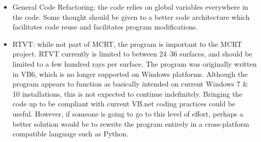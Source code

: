 \documentclass{article}
\begin{document}
\begin{itemize}
    \item General Code Refactoring: the code relies on global variables everywhere in the code. Some thought should be given to a better code architecture which facilitates code reuse and facilitates program modifications.

    \item RTVT: while not part of MCRT, the program is important to the MCRT project. RTVT currently is limited to between 24--36 surfaces, and should be limited to a few hundred rays per surface. The program was originally written in VB6, which is no longer supported on Windows platforms. Although the program appears to function as basically intended on current Windows 7 \& 10 installations, this is not expected to continue indefinitely. Bringing the code up to be compliant with current VB.net coding practices could be useful. However, if someone is going to go to this level of effort, perhaps a better solution would be to rewrite the program entirely in a cross-platform compatible language such as Python.

\end{itemize}

\newpage
\renewcommand\bibname{References}

\end{document}
